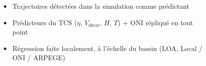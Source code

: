 \documentclass[aspectratio=169, usepdftitle=false, xcolor={dvipsnames}, 9pt,table]{beamer}
\begin{document}
\begin{frame}[t]
{\begin{columns}[t]
\begin{column}{0.6\textwidth}
\begin{figure}
                \end{figure}
            \end{column}
            \begin{column}{0.4\textwidth}
                \begin{examples}[Méthodologie]
                    \setlength{\leftmargini}{2.5ex}
                    \begin{itemize}
                        \item Trajectoires détectées dans la simulation \parencite{chauvin_future_2020} comme prédictant
                        \item Prédicteurs du TCS ($\eta$, $V_\text{shear}$, $H$, $T$) + ONI \alert{répliqué} en tout point
                        \item Régression faite \alert{localement}, à l'échelle du bassin (LOA, Local / ONI / ARPEGE)
                    \end{itemize}
                \end{examples}
            \end{column}
        \end{columns}
    }
\end{frame}
\end{document}
